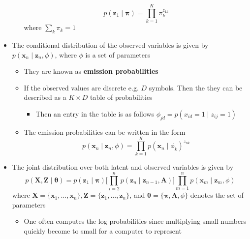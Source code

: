 \documentclass[a4, english]{article}
\begin{document}
\begin{itemize}
\begin{itemize}
\begin{equation*}
      p(\pmb z_1 \mid \pmb \pi) = \prod_{k=1}^K \pi_k^{z_{1k}}
    \end{equation*}
where $\sum_k \pi_k = 1$ 
  \end{itemize} 
  \item The conditional distribution of the observed variables is given by $p(\pmb x_n \mid \pmb z_n, \phi)$, where $\phi$ is a set of parameters 
  \begin{itemize}
  	\item They are known as \textbf{emission probabilities}
    \item If the observed values are discrete e.g. $D$ symbols. Then the they can be described as a $K \times D$ table of probabilities    
    \begin{itemize}
    	\item Then an entry in the table is as follows $\phi_{jd} = p(x_{id} = 1 \mid z_{ij} = 1 )$ 
    \end{itemize}
    \item The emission probabilities can be written in the form  
    \begin{equation*}
      p(\pmb x_n \mid \pmb z_n, \phi) = \prod_{k=1}^K p(\pmb x_n \mid \phi_k)^{z_{nk}}
    \end{equation*}
  \end{itemize}
  \item The joint distribution over both latent and observed variables is given by
\begin{equation*}
  p(\pmb X, \pmb Z \mid \pmb \theta) = p(\pmb z_1 \mid \pmb \pi) \bigg [ \prod_{i=2}^n p(\pmb z_n \mid \pmb z_{n-1}, \pmb A) \bigg ] \prod_{m=1}^n p(\pmb x_m \mid \pmb z_m , \phi)
\end{equation*}
where $\pmb X = \{\pmb x_1, \dots, \pmb x_n\}, \pmb Z = \{\pmb z_1, \dots, \pmb z_n\}$, and $\pmb \theta = \{\pmb \pi, \pmb A, \phi \}$ denotes the set of parameters
  \begin{itemize}
  	\item One often computes the log probabilities since multiplying small numbers quickly become to small for a computer to represent 
  \end{itemize}
\end{itemize}
\end{document}
